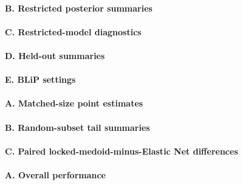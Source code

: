 

\paragraph*{B. Restricted posterior summaries}



\paragraph*{C. Restricted-model diagnostics}



\paragraph*{D. Held-out summaries}



\paragraph*{E. BLiP settings}









\paragraph*{A. Matched-size point estimates}



\paragraph*{B. Random-subset tail summaries}



\paragraph*{C. Paired locked-medoid-minus-Elastic Net differences}



\paragraph*{A. Overall performance}

